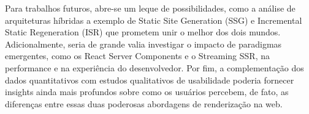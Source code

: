 Para trabalhos futuros, abre-se um leque de possibilidades, como a análise de arquiteturas híbridas a exemplo de Static Site Generation (SSG) e Incremental Static Regeneration (ISR) que prometem unir o melhor dos dois mundos. Adicionalmente, seria de grande valia investigar o impacto de paradigmas emergentes, como os React Server Components e o Streaming SSR, na performance e na experiência do desenvolvedor. Por fim, a complementação dos dados quantitativos com estudos qualitativos de usabilidade poderia fornecer insights ainda mais profundos sobre como os usuários percebem, de fato, as diferenças entre essas duas poderosas abordagens de renderização na web.